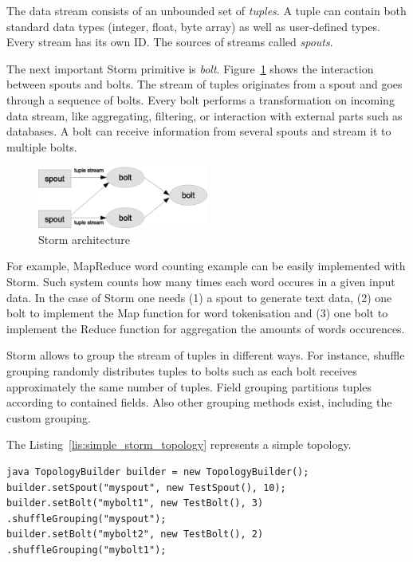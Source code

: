 The data stream consists of an unbounded set of \textit{tuples}.
A tuple can contain both standard data types (integer, float, byte array) as well as user-defined types.
Every stream has its own ID.
The sources of streams called \textit{spouts}. 

The next important Storm primitive is \textit{bolt}.
Figure~\ref{fig:storm_architecture} shows the interaction between spouts and bolts.
The stream of tuples originates from a spout and goes through a sequence of bolts.
Every bolt performs a transformation on incoming data stream, like aggregating, filtering, or interaction with external parts such as databases.
A bolt can receive information from several spouts and stream it to multiple bolts.

\begin{figure}
  \centering
  \includegraphics [width=0.5\textwidth]{images/storm_architecture}
  \caption{Storm architecture}
  \label{fig:storm_architecture}
\end{figure}

For example, MapReduce word counting example can be easily implemented with Storm.
Such system counts how many times each word occures in a given input data.
In the case of Storm one needs 
(1) a spout to generate text data, 
(2) one bolt to implement the Map function for word tokenisation and 
(3) one bolt to implement the Reduce function for aggregation the amounts of words occurences. 

Storm allows to group the stream of tuples in different ways.
For instance, shuffle grouping randomly distributes tuples to bolts such as each bolt receives approximately the same number of tuples.
Field grouping partitions tuples according to contained fields.
Also other grouping methods exist, including the custom grouping.

The Listing~\ref{lis:simple_storm_topology} represents a simple topology.

\begin{lstlisting}[caption=Simple Storm topology, label=lis:simple_storm_topology]
java TopologyBuilder builder = new TopologyBuilder();
builder.setSpout("myspout", new TestSpout(), 10);
builder.setBolt("mybolt1", new TestBolt(), 3) .shuffleGrouping("myspout");
builder.setBolt("mybolt2", new TestBolt(), 2) .shuffleGrouping("mybolt1");
\end{lstlisting}

